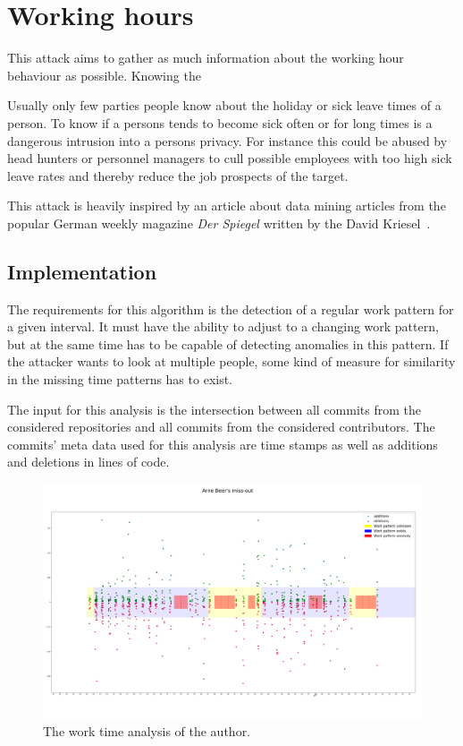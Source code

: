 \section{Working hours}

This attack aims to gather as much information about the working hour behaviour as possible.
Knowing the

Usually only few parties people know about the holiday or sick leave times of a person.
To know if a persons tends to become sick often or for long times is a dangerous intrusion into a persons privacy.
For instance this could be abused by head hunters or personnel managers to cull possible employees with too high sick leave rates and thereby reduce the job prospects of the target.

This attack is heavily inspired by an article about data mining articles from the popular German weekly magazine \emph{Der Spiegel} written by the David Kriesel~\cite{article:spiegel-mining}.


\subsection{Implementation}

The requirements for this algorithm is the detection of a regular work pattern for a given interval.
It must have the ability to adjust to a changing work pattern, but at the same time has to be capable of detecting anomalies in this pattern.
If the attacker wants to look at multiple people, some kind of measure for similarity in the missing time patterns has to exist.

The input for this analysis is the intersection between all commits from the considered repositories and all commits from the considered contributors.
The commits' meta data used for this analysis are time stamps as well as additions and deletions in lines of code.

\begin{figure}[H]
    \includegraphics[scale=0.20]{./graphs/analysis/work-time-analysis}
    \centering
    \caption{The work time analysis of the author.}\label{fig:missing-time}
\end{figure}

